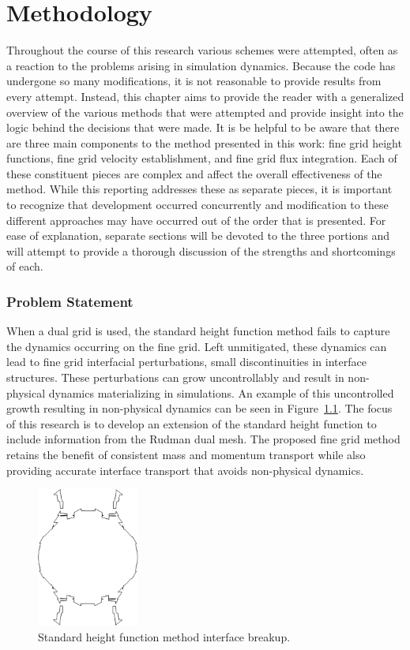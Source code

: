 \chapter{Methodology} \label{CH:method}

Throughout the course of this research various schemes were attempted, often as a reaction to the problems arising in simulation dynamics. Because the code has undergone so many modifications, it is not reasonable to provide results from every attempt. Instead, this chapter aims to provide the reader with a generalized overview of the various methods that were attempted and provide insight into the logic behind the decisions that were made. It is be helpful to be aware that there are three main components to the method presented in this work: fine grid height functions, fine grid velocity establishment, and fine grid flux integration. Each of these constituent pieces are complex and affect the overall effectiveness of the method. While this reporting addresses these as separate pieces, it is important to recognize that development occurred concurrently and modification to these different approaches may have occurred out of the order that is presented. For ease of explanation, separate sections will be devoted to the three portions and will attempt to provide a thorough discussion of the strengths and shortcomings of each.

\subsection{Problem Statement}
When a dual grid is used, the standard height function method fails to capture the dynamics occurring on the fine grid. Left unmitigated, these dynamics can lead to fine grid interfacial perturbations, small discontinuities in interface structures. These perturbations can grow uncontrollably and result in non-physical dynamics materializing in simulations. An example of this uncontrolled growth resulting in non-physical dynamics can be seen in Figure~\ref{bad2}. The focus of this research is to develop an extension of the standard height function to include information from the Rudman dual mesh. The proposed  fine grid method retains the benefit of consistent mass and momentum transport while also providing accurate interface transport that avoids non-physical dynamics. 
\begin{figure}[htbp]
	\centering
	\includegraphics[width=0.3\textwidth]{figs/bad.png}
	\caption{Standard height function method interface breakup.}
	\label{bad2} 
\end{figure} 

